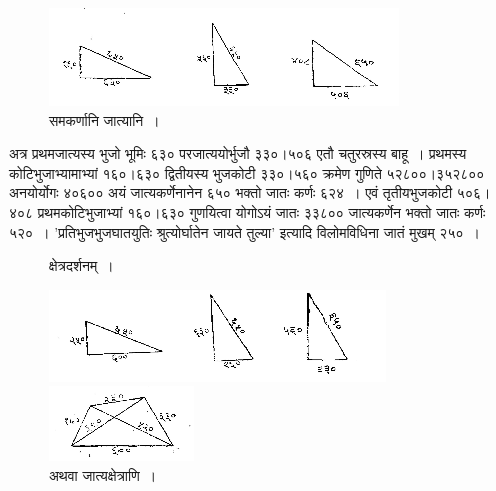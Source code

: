 \documentclass[11pt, openany]{book}
\begin{document}
\newpage%

\begin{figure}[h!]
         \centering
           \captionsetup{labelformat=empty}
         \caption{समकर्णानि जात्यानि~।}
\vspace{-2mm}
         \includegraphics[scale=0.85]{graphics/capture160.png}
     \end{figure}
\vspace{-2mm}

 अत्र प्रथमजात्यस्य भुजो भूमिः ६३० परजात्ययोर्भुजौ ३३०।५०६ एतौ चतुरस्रस्य बाहू~। प्रथमस्य कोटिभुजाभ्यामाभ्यां १६०।६३०
द्वितीयस्य भुजकोटी ३३०।५६० क्रमेण गुणिते ५२८००।३५२८०० अनयोर्योगः
४०६०० अयं जात्यकर्णेनानेन ६५० भक्तो जातः कर्णः ६२४~। एवं तृतीयभुजकोटी
५०६।४०८ प्रथमकोटिभुजाभ्यां १६०।६३० गुणयित्वा योगोऽयं जातः ३३८००
जात्यकर्णेन भक्तो जातः कर्णः ५२०~। 'प्रतिभुजभुजघातयुतिः श्रुत्योर्घातेन
जायते तुल्या' इत्यादि विलोमविधिना जातं मुखम् २५०~। 

\begin{figure}[h!]
         \centering
           \captionsetup{labelformat=empty}
         \caption{क्षेत्रदर्शनम्~।}
\vspace{-2mm}
         \includegraphics[scale=0.85]{graphics/capture162.png}
     \caption{अथवा जात्यक्षेत्राणि~।}
\vspace{-2mm}
     \includegraphics[scale=0.85]{graphics/capture163.png}
     \end{figure}
\newpage
\end{document}

